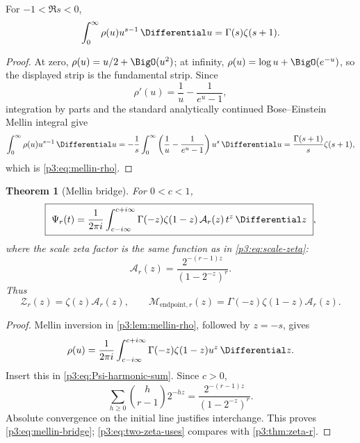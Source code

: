 \documentclass[11pt,oneside]{article}
\newtheorem{theorem}{Theorem}[section]
\theoremstyle{definition}
\theoremstyle{remark}
\begin{document}
\begin{lemma}\label{p3:lem:mellin-rho}
For $-1<\Re s<0$,
\begin{equation}\label{p3:eq:mellin-rho}
 \int_0^{\infty}\rho(u)u^{s-1}\,\Differential u
 =\Gamma(s)\zeta(s+1).
\end{equation}
\end{lemma}

\begin{proof}
At zero, $\rho(u)=u/2+\BigO(u^2)$; at infinity, $\rho(u)=\log u+\BigO(e^{-u})$, so the displayed strip is the fundamental strip.  Since
\[
 \rho'(u)=\frac1u-\frac1{e^u-1},
\]
integration by parts and the standard analytically continued Bose--Einstein Mellin integral give
\[
 \int_0^\infty\rho(u)u^{s-1}\,\Differential u
 =-\frac1s\int_0^\infty
 \left(\frac1u-\frac1{e^u-1}\right)u^s\,\Differential u
 =\frac{\Gamma(s+1)}s\zeta(s+1),
\]
which is \eqref{p3:eq:mellin-rho}.
\end{proof}

\begin{theorem}[Mellin bridge]\label{p3:thm:mellin-bridge}
For $0<c<1$,
\begin{equation}\label{p3:eq:mellin-bridge}
 \boxed{\ 
 \Psi_r(t)=\frac1{2\pi i}
 \int_{c-i\infty}^{c+i\infty}
 \Gamma(-z)\zeta(1-z)\,
 \mathcal A_r(z)\,t^z\,\Differential z
 \ },
\end{equation}
where the scale zeta factor is the same function as in \eqref{p3:eq:scale-zeta}:
\begin{equation}\label{p3:eq:scale-zeta-repeat}
  \mathcal A_r(z)=\frac{2^{-(r-1)z}}{(1-2^{-z})^r}.
\end{equation}
Thus
\begin{equation}\label{p3:eq:two-zeta-uses}
 \mathcal Z_r(z)=\zeta(z)\mathcal A_r(z),
 \qquad
 \mathcal M_{\mathrm{endpoint},r}(z)
 =\Gamma(-z)\zeta(1-z)\mathcal A_r(z).
\end{equation}
\end{theorem}

\begin{proof}
Mellin inversion in \cref{p3:lem:mellin-rho}, followed by $z=-s$, gives
\[
 \rho(u)=\frac1{2\pi i}\int_{c-i\infty}^{c+i\infty}
 \Gamma(-z)\zeta(1-z)u^z\,\Differential z.
\]
Insert this in \eqref{p3:eq:Psi-harmonic-sum}.  Since $c>0$,
\[
 \sum_{h\ge0}\binom h{r-1}2^{-hz}
 =\frac{2^{-(r-1)z}}{(1-2^{-z})^r}.
\]
Absolute convergence on the initial line justifies interchange.  This proves \eqref{p3:eq:mellin-bridge}; \eqref{p3:eq:two-zeta-uses} compares with \cref{p3:thm:zeta-r}.
\end{proof}
\end{document}
